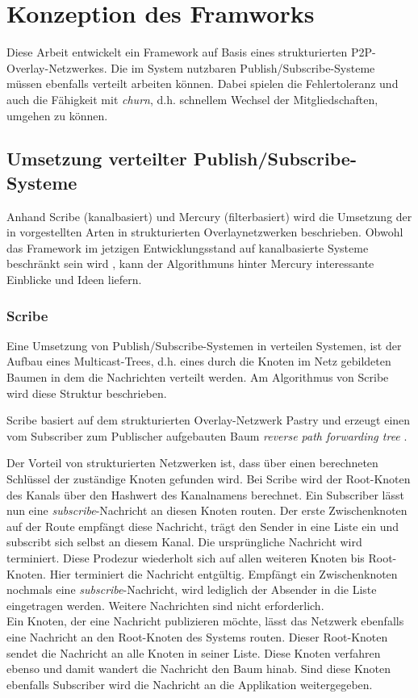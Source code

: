 \chapter{Konzeption des Framworks}
\label{chap:konzeption_pubsub}
Diese Arbeit entwickelt ein Framework auf Basis eines strukturierten P2P-Overlay-Netzwerkes. Die im System nutzbaren Publish/Subscribe-Systeme müssen ebenfalls verteilt arbeiten können. Dabei spielen die Fehlertoleranz und auch die Fähigkeit mit \emph{churn}, d.h. schnellem Wechsel der Mitgliedschaften, umgehen zu können.


\section{Umsetzung verteilter Publish/Subscribe-Systeme}
Anhand Scribe (kanalbasiert) \cite{Castro2002Scribe} und Mercury (filterbasiert) \cite{Bharambe2004Mercury} wird die Umsetzung der in  vorgestellten Arten in strukturierten Overlaynetzwerken beschrieben. Obwohl das Framework im jetzigen Entwicklungsstand auf kanalbasierte Systeme beschränkt sein wird , kann der Algorithmuns hinter Mercury interessante Einblicke und Ideen liefern.

\subsection*{Scribe}
\label{chap:related:scribe}
Eine Umsetzung von Publish/Subscribe-Systemen in verteilen Systemen, ist der Aufbau eines Multicast-Trees, d.h. eines durch die Knoten im Netz gebildeten Baumen in dem die Nachrichten verteilt werden. Am Algorithmus von Scribe wird diese Struktur beschrieben.

Scribe basiert auf dem strukturierten Overlay-Netzwerk Pastry \cite{Rowstron2001} und erzeugt einen vom Subscriber zum Publischer aufgebauten Baum \emph{reverse path forwarding tree} \cite{Dalal1978}.

Der Vorteil von strukturierten Netzwerken ist, dass über einen berechneten Schlüssel der zuständige Knoten gefunden wird. Bei Scribe wird der Root-Knoten des Kanals über den Hashwert des Kanalnamens berechnet. Ein Subscriber lässt nun eine \emph{subscribe}-Nachricht an diesen Knoten routen. Der erste Zwischenknoten auf der Route empfängt diese Nachricht, trägt den Sender in eine Liste ein und subscribt sich selbst an diesem Kanal. Die ursprüngliche Nachricht wird terminiert. Diese Prodezur wiederholt sich auf allen weiteren Knoten bis Root-Knoten. Hier terminiert die Nachricht entgültig. Empfängt ein Zwischenknoten nochmals eine \emph{subscribe}-Nachricht, wird lediglich der Absender in die Liste eingetragen werden. Weitere Nachrichten sind nicht erforderlich.\\
Ein Knoten, der eine Nachricht publizieren möchte, lässt das Netzwerk ebenfalls eine Nachricht an den Root-Knoten des Systems routen. Dieser Root-Knoten sendet die Nachricht an alle Knoten in seiner Liste. Diese Knoten verfahren ebenso und damit wandert die Nachricht den Baum hinab. Sind diese Knoten ebenfalls Subscriber wird die Nachricht an die Applikation weitergegeben.

